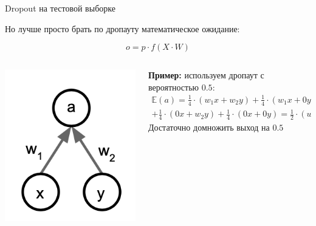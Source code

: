 \documentclass[notes,12pt, aspectratio=169]{beamer}
\newenvironment{wideitemize}{\itemize\addtolength{\itemsep}{10pt}}{\enditemize}
\begin{document}
\begin{frame}{Dropout на тестовой выборке}
	\begin{wideitemize}
	\item Но лучше просто брать по дропауту математическое ожидание: 
	
	$$
	o = p \cdot f(X \cdot W)
	$$
	\end{wideitemize}
	\begin{columns}
		\begin{column}{.25\textwidth}
			\begin{center}
				\includegraphics[width=.85\linewidth]{dropout_ex.png}
			\end{center}
		\end{column}
		\begin{column}{.75\textwidth}
			\textbf{Пример:} используем дропаут с вероятностью $0.5$: \\
			\begin{multline*}
				\mathbb{E}(a) = \frac{1}{4} \cdot(w_1 x+ w_2 y) + \frac{1}{4} \cdot(w_1 x+ 0 y) + \\ + \frac{1}{4} \cdot(0 x+ w_2 y) + \frac{1}{4} \cdot(0 x+ 0 y) = \frac{1}{2} \cdot (w_1 \cdot x + w_2 \cdot y)
			\end{multline*}
		\alert{Достаточно домножить выход на $0.5$}
		\end{column}
	\end{columns}
\end{frame}
\end{document}

